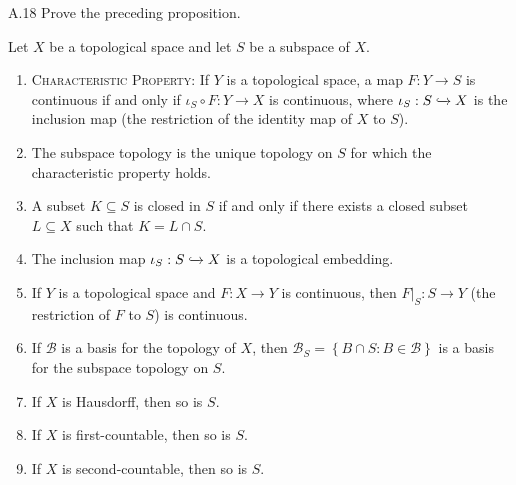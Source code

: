\begin{exercise}{A.18}
    Prove the preceding proposition.

    Let \( X \) be a topological space and let \( S \) be a subspace of \( X \).
    \begin{enumerate}[itemsep=0pt,label={(\alph*)}]
        \item \textsc{Characteristic Property:} If \( Y \) is a topological space, a map \( F: Y \to S \) is continuous if and only if \( \iota_{S} \circ F: Y \to X \) is continuous, where \( \iota_{S}: S \xhookrightarrow{} X \) is the inclusion map (the restriction of the identity map of \(X\) to \(S\)).
        \item The subspace topology is the unique topology on \( S \) for which the characteristic property holds.
        \item A subset \( K \subseteq S \) is closed in \( S \) if and only if there exists a closed subset \( L \subseteq X \) such that \( K = L \cap S \).
        \item The inclusion map \( \iota_{S}: S \xhookrightarrow{} X \) is a topological embedding.
        \item If \( Y \) is a topological space and \( F: X \to Y \) is continuous, then \( F\vert_{S}: S \to Y \) (the restriction of \(F\) to \(S\)) is continuous.
        \item If \( \mathcal{B} \) is a basis for the topology of \( X \), then \( \mathcal{B}_{S} = \left\{ B \cap S : B \in \mathcal{B} \right\} \) is a basis for the subspace topology on \( S \).
        \item If \( X \) is Hausdorff, then so is \( S \).
        \item If \( X \) is first-countable, then so is \( S \).
        \item If \( X \) is second-countable, then so is \( S \).
    \end{enumerate}
\end{exercise}

